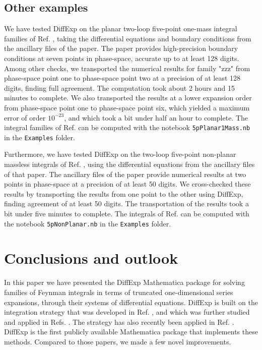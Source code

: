 \documentclass{article}
\begin{document}
\subsection{Other examples}
We have tested DiffExp on the planar two-loop five-point one-mass integral families of Ref. \cite{Abreu:2020jxa}, taking the differential equations and boundary conditions from the ancillary files of the paper. The paper provides high-precision boundary conditions at seven points in phase-space, accurate up to at least 128 digits. Among other checks, we transported the numerical results for family "zzz" from phase-space point one to phase-space point two at a precision of at least 128 digits, finding full agreement. The computation took about 2 hours and 15 minutes to complete. We also transported the results at a lower expansion order from phase-space point one to phase-space point six, which yielded a maximum error of order $10^{-23}$, and which took a bit under half an hour to complete. The integral families of Ref. \cite{Abreu:2020jxa} can be computed with the notebook \texttt{5pPlanar1Mass.nb} in the \texttt{Examples} folder.

Furthermore, we have tested DiffExp on the two-loop five-point non-planar massless integrals of Ref. \cite{Chicherin:2018old}, using the differential equations from the ancillary files of that paper. The ancillary files of the paper provide numerical results at two points in phase-space at a precision of at least 50 digits. We cross-checked these results by transporting the results from one point to the other using DiffExp, finding agreement of at least 50 digits. The transportation of the results took a bit under five minutes to complete. The integrals of Ref. \cite{Chicherin:2018old} can be computed with the notebook \texttt{5pNonPlanar.nb} in the \texttt{Examples} folder.

\section{Conclusions and outlook}
\label{sec:conclusions}
In this paper we have presented the DiffExp Mathematica package for solving families of Feynman integrals in terms of truncated one-dimensional series expansions, through their systems of differential equations. DiffExp is built on the integration strategy that was developed in Ref. \cite{Francesco:2019yqt}, and which was further studied and applied in Refs. \cite{Bonciani:2019jyb, Frellesvig:2019byn}. The strategy has also recently been applied in Ref. \cite{Abreu:2020jxa}. DiffExp is the first publicly available Mathematica package that implements these methods. Compared to those papers, we made a few novel improvements. 
\end{document}
